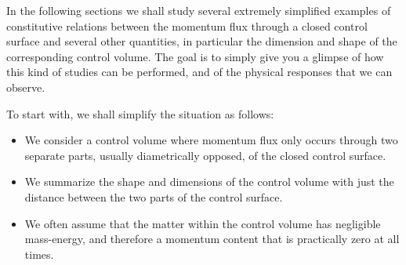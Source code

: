 \documentclass[a4paper,12pt,%
onecolumn,oneside,%
british%
]{memoir}
\renewcommand*{\|}[1][]{\nonscript\:#1\vert\nonscript\:\mathopen{}}
\newcommand*{\masse}{mass-energy}
\begin{document}
\medskip

In the following sections we shall study several extremely simplified examples of constitutive relations between the momentum flux through a closed control surface and several other quantities, in particular the dimension and shape of the corresponding control volume. The goal is to simply give you a glimpse of how this kind of studies can be performed, and of the physical responses that we can observe.

To start with, we shall simplify the situation as follows:
\begin{itemize}
\item We consider a control volume where momentum flux only occurs through two separate parts, usually diametrically opposed, of the closed control surface.
\item We summarize the shape and dimensions of the control volume with just the distance between the two parts of the control surface.
\item We often assume that the matter within the control volume has negligible \masse, and therefore a momentum content that is practically zero at all times.
\end{itemize}
\end{document}
